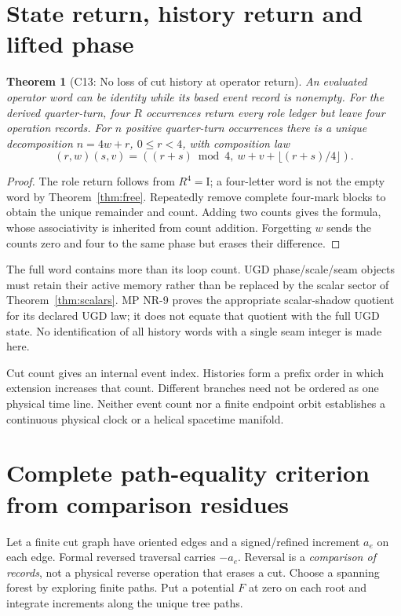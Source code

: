 \documentclass[11pt]{article}
\newtheorem{theorem}{Theorem}[section]
\newcommand{\Id}{\mathrm I}
\begin{document}
\section{State return, history return and lifted phase}
\label{sec:memory}
\begin{theorem}[C13: No loss of cut history at operator return]
\label{thm:memory}
An evaluated operator word can be identity while its based event record is
nonempty. For the derived quarter-turn, four $R$ occurrences return every
role ledger but leave four operation records. For $n$ positive quarter-turn
occurrences there is a unique decomposition $n=4w+r$, $0\le r<4$, with
composition law
\[
(r,w)(s,v)=((r+s)\bmod4,\ w+v+\lfloor(r+s)/4\rfloor).
\]
\end{theorem}
\begin{proof}
The role return follows from $R^4=\Id$; a four-letter word is not the empty
word by Theorem~\ref{thm:free}. Repeatedly remove complete four-mark blocks
to obtain the unique remainder and count. Adding two counts gives the formula,
whose associativity is inherited from count addition. Forgetting $w$ sends
the counts zero and four to the same phase but erases their difference.
\end{proof}
The full word contains more than its loop count. UGD phase/scale/seam objects
must retain their active memory rather than be replaced by the scalar sector
of Theorem~\ref{thm:scalars}. MP NR-9 proves the appropriate scalar-shadow
quotient for its declared UGD law; it does not equate that quotient with the
full UGD state. No identification of all history words with a single seam
integer is made here.

Cut count gives an internal event index. Histories form a prefix order in
which extension increases that count. Different branches need not be ordered
as one physical time line. Neither event count nor a finite endpoint orbit
establishes a continuous physical clock or a helical spacetime manifold.

\section{Complete path-equality criterion from comparison residues}
\label{sec:paths}
Let a finite cut graph have oriented edges and a
signed/refined increment $a_e$ on each edge. Formal reversed traversal carries
$-a_e$. Reversal is a \emph{comparison of records}, not a physical reverse
operation that erases a cut. Choose a spanning forest by exploring finite
paths. Put a potential $F$ at zero on each root and integrate increments
along the unique tree paths.
\end{document}
